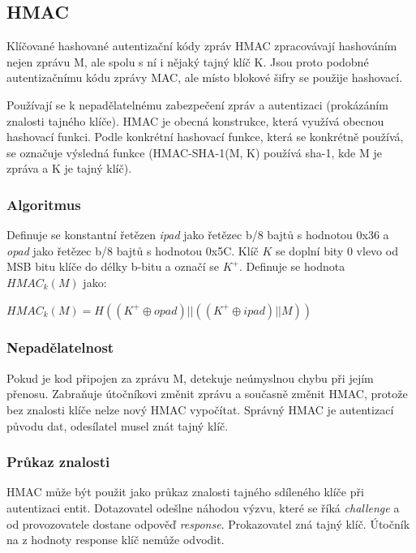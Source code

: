 \documentclass{szzclass}
\begin{document}
\subsection{HMAC}
Klíčované hashované autentizační kódy zpráv HMAC zpracovávají hashováním nejen zprávu M, ale spolu s ní i nějaký tajný klíč K.
Jsou proto podobné autentizačnímu kódu zprávy MAC, ale místo blokové šifry se použije hashovací.

Používají se k nepadělatelnému zabezpečení zpráv a autentizaci (prokázáním znalosti tajného klíče). HMAC je obecná konstrukce, která využívá obecnou hashovací funkci.
Podle konkrétní hashovací funkce, která se konkrétně používá, se označuje výsledná funkce (HMAC-SHA-1(M, K) používá sha-1, kde M je zpráva a K je tajný klíč).
\subsubsection{Algoritmus}
Definuje se konstantní řetězen \textit{ipad} jako řetězec b/8 bajtů s hodnotou 0x36 a \textit{opad} jako řetězec b/8 bajtů s hodnotou 0x5C.
Klíč $K$ se doplní bity 0 vlevo od MSB bitu klíče do délky b-bitu a označí se $K^+$. Definuje se hodnota $HMAC_k(M)$ jako:
\begin{center}
$HMAC_k(M) = H((K^+ \oplus opad)||((K^+ \oplus ipad)||M))$
\end{center}
\subsubsection{Nepadělatelnost}
Pokud je kod připojen za zprávu M, detekuje neúmyslnou chybu při jejím přenosu. Zabraňuje útočníkovi změnit zprávu a současně změnit HMAC, protože
bez znalosti klíče nelze nový HMAC vypočítat. Správný HMAC je autentizací původu dat, odesílatel musel znát tajný klíč.
\subsubsection{Průkaz znalosti}
HMAC může být použit jako průkaz znalosti tajného sdíleného klíče při autentizaci entit. Dotazovatel odešlne náhodou výzvu, které se říká \textit{challenge}
a od provozovatele dostane odpověď \textit{response}. Prokazovatel zná tajný klíč. Útočník na z hodnoty response klíč nemůže odvodit.
\end{document}
